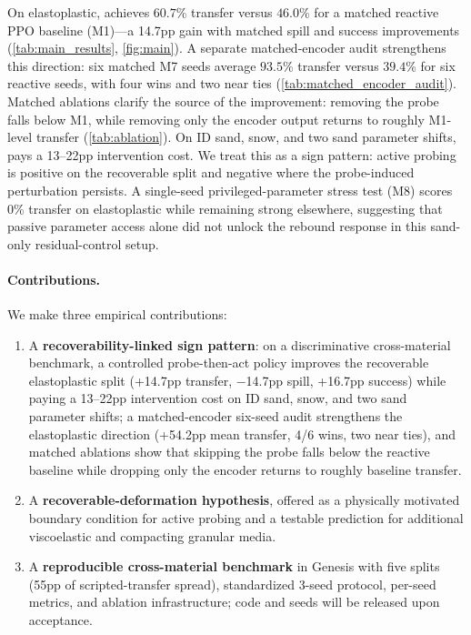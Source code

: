 On elastoplastic, \PTA{} achieves $60.7$\% transfer versus $46.0$\% for a matched reactive PPO baseline (M1)---a 14.7pp gain with matched spill and success improvements (\cref{tab:main_results}, \cref{fig:main}). A separate matched-encoder audit strengthens this direction: six matched M7 seeds average $93.5$\% transfer versus $39.4$\% for six reactive seeds, with four wins and two near ties (\cref{tab:matched_encoder_audit}). Matched ablations clarify the source of the improvement: removing the probe falls below M1, while removing only the encoder output returns to roughly M1-level transfer (\cref{tab:ablation}). On ID sand, snow, and two sand parameter shifts, \PTA{} pays a 13--22pp intervention cost. We treat this as a sign pattern: active probing is positive on the recoverable split and negative where the probe-induced perturbation persists. A single-seed privileged-parameter stress test (M8) scores 0\% transfer on elastoplastic while remaining strong elsewhere, suggesting that passive parameter access alone did not unlock the rebound response in this sand-only residual-control setup.

\paragraph{Contributions.} We make three empirical contributions:
\begin{enumerate}
    \item A \textbf{recoverability-linked sign pattern}: on a discriminative cross-material benchmark, a controlled probe-then-act policy improves the recoverable elastoplastic split (+14.7pp transfer, $-$14.7pp spill, +16.7pp success) while paying a 13--22pp intervention cost on ID sand, snow, and two sand parameter shifts; a matched-encoder six-seed audit strengthens the elastoplastic direction (+54.2pp mean transfer, 4/6 wins, two near ties), and matched ablations show that skipping the probe falls below the reactive baseline while dropping only the encoder returns to roughly baseline transfer.
    \item A \textbf{recoverable-deformation hypothesis}, offered as a physically motivated boundary condition for active probing and a testable prediction for additional viscoelastic and compacting granular media.
    \item A \textbf{reproducible cross-material benchmark} in Genesis with five splits (55pp of scripted-transfer spread), standardized 3-seed protocol, per-seed metrics, and ablation infrastructure; code and seeds will be released upon acceptance.
\end{enumerate}

